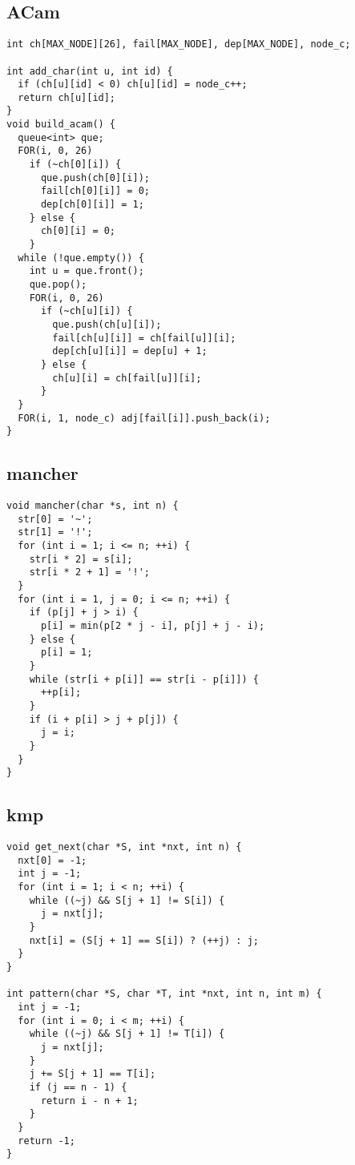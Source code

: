 \documentclass[twoside]{article}
\begin{document}
\subsection{ACam}
\begin{lstlisting}
int ch[MAX_NODE][26], fail[MAX_NODE], dep[MAX_NODE], node_c;

int add_char(int u, int id) {
  if (ch[u][id] < 0) ch[u][id] = node_c++;
  return ch[u][id];
}
void build_acam() {
  queue<int> que;
  FOR(i, 0, 26)
    if (~ch[0][i]) {
      que.push(ch[0][i]);
      fail[ch[0][i]] = 0;
      dep[ch[0][i]] = 1;
    } else {
      ch[0][i] = 0;
    }
  while (!que.empty()) {
    int u = que.front();
    que.pop();
    FOR(i, 0, 26)
      if (~ch[u][i]) {
        que.push(ch[u][i]);
        fail[ch[u][i]] = ch[fail[u]][i];
        dep[ch[u][i]] = dep[u] + 1;
      } else {
        ch[u][i] = ch[fail[u]][i];
      }
  }
  FOR(i, 1, node_c) adj[fail[i]].push_back(i);
}

\end{lstlisting}
\subsection{mancher}
\begin{lstlisting}
void mancher(char *s, int n) {
  str[0] = '~';
  str[1] = '!';
  for (int i = 1; i <= n; ++i) {
    str[i * 2] = s[i];
    str[i * 2 + 1] = '!';
  }
  for (int i = 1, j = 0; i <= n; ++i) {
    if (p[j] + j > i) {
      p[i] = min(p[2 * j - i], p[j] + j - i);
    } else {
      p[i] = 1;
    }
    while (str[i + p[i]] == str[i - p[i]]) {
      ++p[i];
    }
    if (i + p[i] > j + p[j]) {
      j = i;
    }
  }
}

\end{lstlisting}
\subsection{kmp}
\begin{lstlisting}
void get_next(char *S, int *nxt, int n) {
  nxt[0] = -1;
  int j = -1;
  for (int i = 1; i < n; ++i) {
    while ((~j) && S[j + 1] != S[i]) {
      j = nxt[j];
    }
    nxt[i] = (S[j + 1] == S[i]) ? (++j) : j;
  }
}

int pattern(char *S, char *T, int *nxt, int n, int m) {
  int j = -1;
  for (int i = 0; i < m; ++i) {
    while ((~j) && S[j + 1] != T[i]) {
      j = nxt[j];
    }
    j += S[j + 1] == T[i];
    if (j == n - 1) {
      return i - n + 1;
    }
  }
  return -1;
}

\end{lstlisting}
\end{document}
